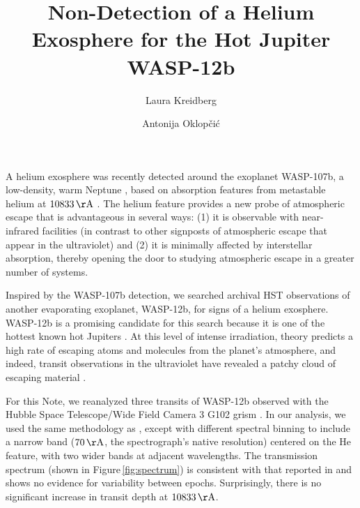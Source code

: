 \documentclass[RNAAS]{aastex62}
\begin{document}
\title{Non-Detection of a Helium Exosphere for the Hot Jupiter WASP-12b}


\author{Laura Kreidberg}

\author{Antonija Oklop\v{c}i\'{c}}
A helium exosphere was recently detected around the exoplanet WASP-107b, a
low-density, warm Neptune \citep{spake18}, based on absorption features from metastable helium at $10833\,\mathrm{\AA}$ \citep[predicted
by][]{seager00,oklopcic18}. The helium feature provides a new probe of atmospheric escape that is
advantageous in several ways: (1) it is observable with near-infrared facilities
(in contrast to other signposts of atmospheric escape that appear in the
ultraviolet) and (2) it is minimally affected by interstellar absorption,
thereby opening the door to studying atmospheric escape in a greater number of systems.

Inspired by the WASP-107b detection, we searched archival HST observations of
another evaporating exoplanet, WASP-12b, for signs of a helium exosphere.
WASP-12b is a promising 
candidate for this search because it is one of the hottest known hot
Jupiters \citep[$T_\mathrm{eq} = 2500$ K;][]{hebb09}. At this level of intense irradiation, theory predicts a high rate of escaping atoms and molecules from the planet's atmosphere, and indeed, transit observations in the ultraviolet have revealed a patchy cloud of escaping material \citep{nichols15}.  

For this Note, we reanalyzed three transits of WASP-12b observed with the
Hubble Space Telescope/Wide Field Camera 3 G102 grism \citep[originally published in][]{kreidberg15b}.  In our analysis, we used the same methodology as
\cite{kreidberg15b}, except with different spectral binning to include a narrow
band ($70\,\mathrm{\AA}$, the spectrograph's native resolution) centered on the
He feature, with two wider bands at adjacent wavelengths. 
The transmission spectrum (shown in Figure\,\ref{fig:spectrum}) is consistent with that reported in
\cite{kreidberg15b} and shows no evidence for variability between epochs.  Surprisingly, there
is no significant increase in transit depth at $10833\,\mathrm{\AA}$.  
\end{document}
